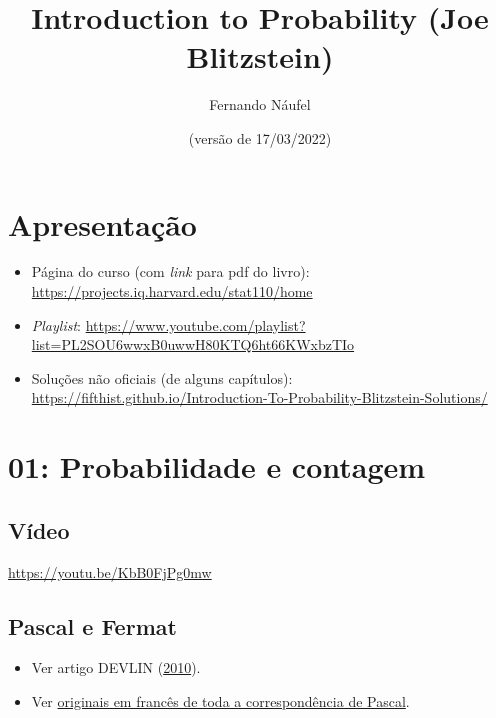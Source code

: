 \documentclass[
  11pt]{report}
\title{Introduction to Probability (Joe Blitzstein)}
\author{Fernando Náufel}
\date{(versão de 17/03/2022)}
\begin{document}
\maketitle

{
\setcounter{tocdepth}{2}
\tableofcontents
}
\hypertarget{apresentauxe7uxe3o}{%
\chapter*{Apresentação}\label{apresentauxe7uxe3o}}

\begin{itemize}
\item
  Página do curso (com \emph{link} para pdf do livro): \url{https://projects.iq.harvard.edu/stat110/home}
\item
  \emph{Playlist}: \url{https://www.youtube.com/playlist?list=PL2SOU6wwxB0uwwH80KTQ6ht66KWxbzTIo}
\item
  Soluções não oficiais (de alguns capítulos): \url{https://fifthist.github.io/Introduction-To-Probability-Blitzstein-Solutions/}
\end{itemize}

\hypertarget{probabilidade-e-contagem}{%
\chapter*{01: Probabilidade e contagem}\label{probabilidade-e-contagem}}

\hypertarget{vuxeddeo}{%
\section*{Vídeo}\label{vuxeddeo}}

\begin{center} \url{https://youtu.be/KbB0FjPg0mw} \end{center}

\hypertarget{pascal-e-fermat}{%
\section*{Pascal e Fermat}\label{pascal-e-fermat}}

\begin{itemize}
\item
  Ver artigo DEVLIN (\protect\hyperlink{ref-devlin-2010-pascal-fermat}{2010}).
\item
  Ver \href{https://gallica.bnf.fr/ark:/12148/bpt6k69975r.image.r=Blaise+Pascal.f233.langFR}{originais em francês de toda a correspondência de Pascal}.
\end{itemize}
\end{document}
